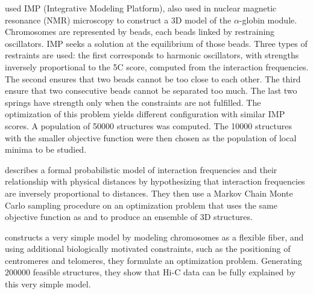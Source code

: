 \citet{bau:three-dimensional} used IMP (Integrative Modeling Platform), also
used in nuclear magnetic resonance (NMR) microscopy to construct a 3D model of
the $\alpha$-globin module. Chromosomes are represented by beads, each beads
linked by restraining oscillators. IMP seeks a solution at the equilibrium of
those beads. Three types of restraints are used: the first  corresponds to
harmonic oscillators, with strengths inversely proportional to the 5C
score, computed from the interaction frequencies. The second ensures that two
beads cannot be too close to each other. The third ensure that two consecutive
beads cannot be separated too much. The last two springs have strength only
when the constraints are not fulfilled. The optimization of this problem
yields different configuration with similar IMP scores. A population of 50000
structures was computed. The 10000 structures with the smaller objective
function were then chosen as the population of local minima to be studied.

\citet{rousseau:three} describes a formal probabilistic model of interaction
frequencies and their relationship with physical distances by hypothesizing
that interaction frequencies are inversely proportional to distances. They
then use a Markov Chain Monte Carlo sampling procedure on an optimization
problem that uses the same objective function as \citet{tanizawa:mapping} and
\citet{duan:three} to produce an ensemble of 3D structures.

\citet{tjong:physical} constructs a very simple model by modeling chromosomes
as a flexible fiber, and using additional biologically motivated constraints,
such as the positioning of centromeres and telomeres, they formulate an
optimization problem. Generating $200000$ feasible structures, they show that
Hi-C data can be fully explained by this very simple model.

